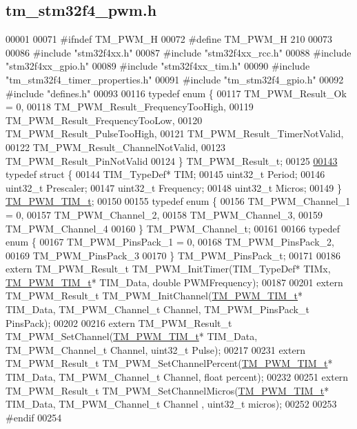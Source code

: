 \hypertarget{tm__stm32f4__pwm_8h_source}{}\subsection{tm\+\_\+stm32f4\+\_\+pwm.\+h}

\begin{DoxyCode}
00001 
00071 \textcolor{preprocessor}{#ifndef TM\_PWM\_H}
00072 \textcolor{preprocessor}{#define TM\_PWM\_H 210}
00073 
00086 \textcolor{preprocessor}{#include "stm32f4xx.h"}
00087 \textcolor{preprocessor}{#include "stm32f4xx\_rcc.h"}
00088 \textcolor{preprocessor}{#include "stm32f4xx\_gpio.h"}
00089 \textcolor{preprocessor}{#include "stm32f4xx\_tim.h"}
00090 \textcolor{preprocessor}{#include "tm\_stm32f4\_timer\_properties.h"}
00091 \textcolor{preprocessor}{#include "tm\_stm32f4\_gpio.h"}
00092 \textcolor{preprocessor}{#include "defines.h"}
00093 
00116 \textcolor{keyword}{typedef} \textcolor{keyword}{enum} \{
00117     TM\_PWM\_Result\_Ok = 0,
00118     TM\_PWM\_Result\_FrequencyTooHigh,
00119     TM\_PWM\_Result\_FrequencyTooLow,
00120     TM\_PWM\_Result\_PulseTooHigh,
00121     TM\_PWM\_Result\_TimerNotValid,
00122     TM\_PWM\_Result\_ChannelNotValid,
00123     TM\_PWM\_Result\_PinNotValid
00124 \} TM\_PWM\_Result\_t;
00125 
\hypertarget{tm__stm32f4__pwm_8h_source_l00143}{}\hyperlink{struct_t_m___p_w_m___t_i_m__t}{00143} \textcolor{keyword}{typedef} \textcolor{keyword}{struct }\{
00144     TIM\_TypeDef* TIM;
00145     uint32\_t Period;
00146     uint32\_t Prescaler;
00147     uint32\_t Frequency;
00148     uint32\_t Micros;
00149 \} \hyperlink{struct_t_m___p_w_m___t_i_m__t}{TM\_PWM\_TIM\_t};
00150 
00155 \textcolor{keyword}{typedef} \textcolor{keyword}{enum} \{
00156     TM\_PWM\_Channel\_1 = 0,
00157     TM\_PWM\_Channel\_2,
00158     TM\_PWM\_Channel\_3,
00159     TM\_PWM\_Channel\_4
00160 \} TM\_PWM\_Channel\_t;
00161 
00166 \textcolor{keyword}{typedef} \textcolor{keyword}{enum} \{
00167     TM\_PWM\_PinsPack\_1 = 0,
00168     TM\_PWM\_PinsPack\_2,
00169     TM\_PWM\_PinsPack\_3
00170 \} TM\_PWM\_PinsPack\_t;
00171 
00186 \textcolor{keyword}{extern} TM\_PWM\_Result\_t TM\_PWM\_InitTimer(TIM\_TypeDef* TIMx, \hyperlink{struct_t_m___p_w_m___t_i_m__t}{TM\_PWM\_TIM\_t}* TIM\_Data, \textcolor{keywordtype}{double} 
      PWMFrequency);
00187 
00201 \textcolor{keyword}{extern} TM\_PWM\_Result\_t TM\_PWM\_InitChannel(\hyperlink{struct_t_m___p_w_m___t_i_m__t}{TM\_PWM\_TIM\_t}* TIM\_Data, TM\_PWM\_Channel\_t Channel, 
      TM\_PWM\_PinsPack\_t PinsPack);
00202 
00216 \textcolor{keyword}{extern} TM\_PWM\_Result\_t TM\_PWM\_SetChannel(\hyperlink{struct_t_m___p_w_m___t_i_m__t}{TM\_PWM\_TIM\_t}* TIM\_Data, TM\_PWM\_Channel\_t Channel, 
      uint32\_t Pulse);
00217 
00231 \textcolor{keyword}{extern} TM\_PWM\_Result\_t TM\_PWM\_SetChannelPercent(\hyperlink{struct_t_m___p_w_m___t_i_m__t}{TM\_PWM\_TIM\_t}* TIM\_Data, TM\_PWM\_Channel\_t 
      Channel, \textcolor{keywordtype}{float} percent);
00232 
00251 \textcolor{keyword}{extern} TM\_PWM\_Result\_t TM\_PWM\_SetChannelMicros(\hyperlink{struct_t_m___p_w_m___t_i_m__t}{TM\_PWM\_TIM\_t}* TIM\_Data, TM\_PWM\_Channel\_t Channel
      , uint32\_t micros);
00252 
00253 \textcolor{preprocessor}{#endif}
00254 
\end{DoxyCode}
